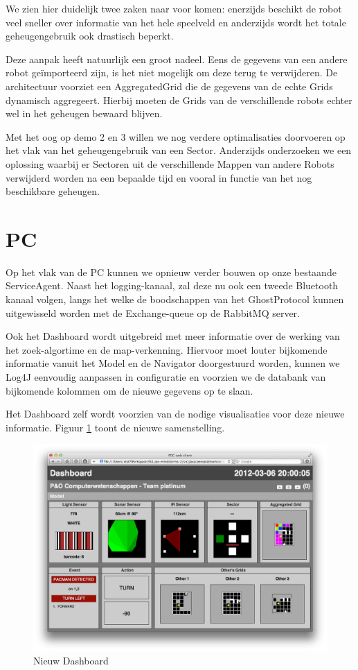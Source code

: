 \documentclass[12pt,a4paper]{report}
\begin{document}
We zien hier duidelijk twee zaken naar voor komen: enerzijds beschikt de robot veel sneller over informatie van het hele speelveld en anderzijds wordt het totale geheugengebruik ook drastisch beperkt.

Deze aanpak heeft natuurlijk een groot nadeel. Eens de gegevens van een andere robot ge\"importeerd zijn, is het niet mogelijk om deze terug te verwijderen. De architectuur voorziet een AggregatedGrid die de gegevens van de echte Grids dynamisch aggregeert. Hierbij moeten de Grids  van de verschillende robots echter wel in het geheugen bewaard blijven.

Met het oog op demo 2 en 3 willen we nog verdere optimalisaties doorvoeren op het vlak van het geheugengebruik van een Sector. Anderzijds onderzoeken we een oplossing waarbij er Sectoren uit de verschillende Mappen van andere Robots verwijderd worden na een bepaalde tijd en vooral in functie van het nog beschikbare geheugen.

\section{PC}

Op het vlak van de PC kunnen we opnieuw verder bouwen op onze bestaande ServiceAgent. Naast het logging-kanaal, zal deze nu ook een tweede Bluetooth kanaal volgen, langs het welke de boodschappen van het GhostProtocol kunnen uitgewisseld worden met de Exchange-queue op de RabbitMQ server.

Ook het Dashboard wordt uitgebreid met meer informatie over de werking van het zoek-algortime en de map-verkenning. Hiervoor moet louter bijkomende informatie vanuit het Model en de Navigator doorgestuurd worden, kunnen we Log4J eenvoudig aanpassen in configuratie en voorzien we de databank van bijkomende kolommen om de nieuwe gegevens op te slaan.

Het Dashboard zelf wordt voorzien van de nodige visualisaties voor deze nieuwe informatie. Figuur \ref{fig:dashboard} toont de nieuwe samenstelling.

\begin{figure}[htbp]
  \centering
  \includegraphics[width=155mm]{resources/dashboard.png}
  \caption{Nieuw Dashboard}
  \label{fig:dashboard}
\end{figure}
\end{document}
